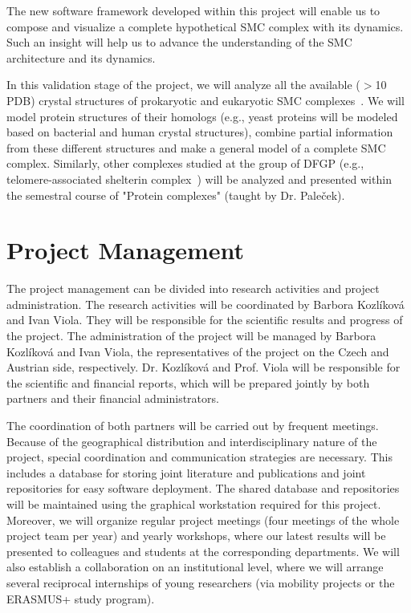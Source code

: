 \documentclass[11pt,a4paper,titlepage,oneside,onecolumn]{article}
\begin{document}
The new software framework developed within this project will enable us to compose and visualize a complete hypothetical SMC complex with its dynamics. 
Such an insight will help us to advance the understanding of the SMC architecture and its dynamics.
 
In this validation stage of the project, we will analyze all the available ($>$10 PDB) crystal structures of prokaryotic and eukaryotic SMC complexes~\cite{Palecek2015}. 
We will model protein structures of their homologs (e.g., yeast proteins will be modeled based on bacterial and human crystal structures), combine partial information from these different structures and make a general model of a complete SMC complex. 
Similarly, other complexes studied at the group of DFGP (e.g., telomere-associated shelterin complex~\cite{Janouskova2015,Schrumpfova}) will be analyzed and presented within the semestral course of "Protein complexes" (taught by Dr. Pale\v{c}ek).





\section{Project Management}
\vspace{-5mm}
The project management can be divided into research activities and project administration.
The research activities will be coordinated by Barbora Kozl\'{i}kov\'{a} and Ivan Viola. 
They will be responsible for the scientific results and progress of the project.
The administration of the project will be managed by Barbora Kozl\'{i}kov\'{a} and Ivan Viola, the representatives of the project on the Czech and Austrian side, respectively. 
Dr. Kozl\'{i}kov\'{a} and Prof. Viola will be responsible for the scientific and financial reports, which will be prepared jointly by both partners and their financial administrators. 

The coordination of both partners will be carried out by frequent meetings. 
Because of the geographical distribution and interdisciplinary nature of the project, special coordination and communication strategies are necessary. 
This includes a database for storing joint literature and publications and joint repositories for easy software deployment. 
The shared database and repositories will be maintained using the graphical workstation required for this project. 
Moreover, we will organize regular project meetings (four meetings of the whole project team per year) and yearly workshops, where our latest results will be presented to colleagues and students at the corresponding departments. 
We will also establish a collaboration on an institutional level, where we will arrange several reciprocal internships of young researchers (via mobility projects or the ERASMUS+ study program). 
 
\end{document}
